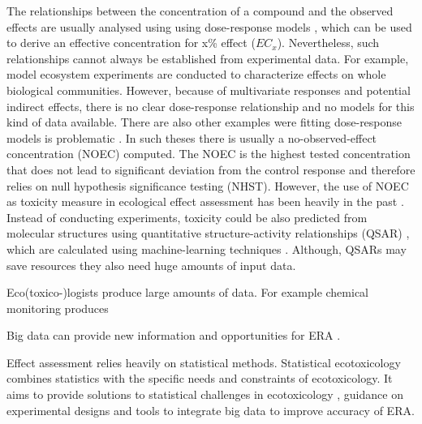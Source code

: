 The relationships between the concentration of a compound and the observed effects are usually analysed using using dose-response models \citep{ritz_toward_2010}, which can be used to derive an effective concentration for x\% effect ($EC_{x}$). 
Nevertheless, such relationships cannot always be established from experimental data.
For example, model ecosystem experiments are conducted to characterize effects on whole biological communities.
However, because of multivariate responses and potential indirect effects, there is no clear dose-response relationship and no models for this kind of data available. 
There are also other examples were fitting dose-response models is problematic \citep{green_issues_2016}. 
In such theses there is usually a no-observed-effect concentration (NOEC) computed. 
The NOEC is the highest tested concentration that does not lead to significant deviation from the control response and therefore relies on null hypothesis significance testing (NHST). 
However, the use of NOEC as toxicity measure in ecological effect assessment has been heavily in the past \citep{laskowski_good_1995, chapman_warning:_1996, warne_noec_2008, fox_what_2012, jager_bad_2012, fox_dont_2016}. 
Instead of conducting experiments, toxicity could be also predicted from molecular structures using quantitative structure-activity relationships (QSAR) \citep{kuhne_read-across_2013}, which are calculated using machine-learning techniques \citep{murrell_chemically_2015, cortes-ciriano_bioalerts:_2016}.
Although, QSARs may save resources they also need huge amounts of input data. 

Eco(toxico-)logists produce large amounts of data. 
For example chemical monitoring produces

Big data can provide new information and opportunities for ERA \citep{dafforn_big_2015}. 

Effect assessment relies heavily on statistical methods.
Statistical ecotoxicology combines statistics with the specific needs and constraints of ecotoxicology. 
It aims to provide solutions to statistical challenges in ecotoxicology \citep{fox_comment_2016}, guidance on experimental designs \citep{johnson_power_2015} and tools to integrate big data \citep {van_den_brink_new_2016} to improve accuracy of ERA. 








